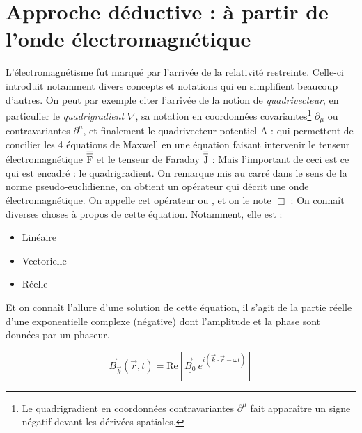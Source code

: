 \documentclass[11pt]{book}
\begin{document}
\section{Approche déductive : à partir de l'onde électromagnétique}
L'électromagnétisme fut marqué par l'arrivée de la relativité restreinte. Celle-ci introduit notamment divers concepts et notations qui en simplifient beaucoup d'autres. On peut par exemple citer l'arrivée de la notion de \textit{quadrivecteur}, en particulier le \textit{quadrigradient} $\nabla$, sa notation en coordonnées covariantes\footnote{Le quadrigradient en coordonnées contravariantes $\partial^\mu$ fait apparaître un signe négatif devant les dérivées spatiales.} $\partial_\mu$ ou contravariantes $\partial^\mu$, et finalement le quadrivecteur potentiel $\mathrm{A}$ :
qui permettent de concilier les 4 équations de Maxwell en une équation faisant intervenir le tenseur électromagnétique $\overline{\raisebox{0pt}[2.2ex]{$\overline{\raisebox{0pt}[1.8ex]{F}}$}}$ et le tenseur de Faraday $\overline{\raisebox{0pt}[2.2ex]{$\overline{\raisebox{0pt}[1.8ex]{J}}$}}$ :
Mais l'important de ceci est ce qui est encadré : le quadrigradient. On remarque mis au carré dans le sens de la norme pseudo-euclidienne, on obtient un opérateur qui décrit une onde électromagnétique. On appelle cet opérateur  ou , et on le note $\Box$ :
On connaît diverses choses à propos de cette équation. Notamment, elle est :
\begin{itemize}
\item Linéaire
\item Vectorielle
\item Réelle
\end{itemize}
Et on connaît l'allure d'une solution de cette équation, il s'agit de la partie réelle d'une exponentielle complexe (négative) dont l'amplitude et la phase sont données par un phaseur. 
\begin{large}
\begin{equation}\label{eq:ondeEM}
\vec{B}_{\vec{k}}(\vec{r},t) = \text{Re}\left[\underline{\vec{B}_0}\ e^{i(\vec{k}\cdot\vec{r} - \omega t)} \right]
\end{equation}
\end{large}
\end{document}
